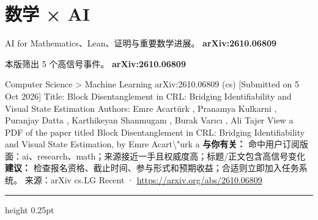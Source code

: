 \documentclass[10.5pt]{ctexart}
\begin{document}
\section*{数学 × AI}
{\color{ormuted} AI for Mathematics、Lean、证明与重要数学进展。}
\vspace{2mm}
{\LARGE\bfseries arXiv:2610.06809}\par
\vspace{1mm}
{\color{ormuted} 本版筛出 5 个高信号事件。}
\vspace{3mm}
{\Large\bfseries arXiv:2610.06809}\par
Computer Science > Machine Learning arXiv:2610.06809 (cs) [Submitted on 5 Oct 2026] Title: Block Disentanglement in CRL: Bridging Identifiability and Visual State Estimation Authors: Emre Acartürk , Pranamya Kulkarni , Puranjay Datta , Karthikeyan Shanmugam , Burak Varıcı , Ali Tajer View a PDF of the paper titled Block Disentanglement in CRL: Bridging Identifiability and Visual State Estimation, by Emre Acart\textbackslash{}"urk a
\textbf{与你有关：} 命中用户订阅版面：ai、research、math；来源接近一手且权威度高；标题/正文包含高信号变化
\textbf{建议：} 检查报名资格、截止时间、参与形式和预期收益；合适则立即加入任务系统。
{\footnotesize\color{ormuted} 来源：arXiv cs.LG Recent · \url{https://arxiv.org/abs/2610.06809}}
\vspace{4mm}
\hrule height 0.25pt
\vspace{3mm}
\end{document}
